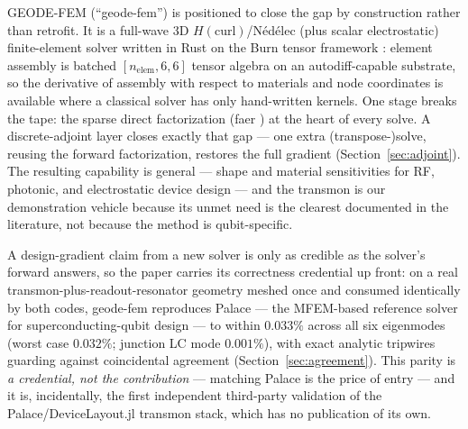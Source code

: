 \documentclass{anvil-paper}
\begin{document}
GEODE-FEM (``geode-fem'') is positioned to close the gap by construction
rather than retrofit. It is a full-wave 3D $H(\mathrm{curl})$/N\'ed\'elec
(plus scalar electrostatic) finite-element solver written in Rust on the
Burn tensor framework \citep{burn}: element assembly is batched
$[n_{\mathrm{elem}},6,6]$ tensor algebra on an autodiff-capable substrate,
so the derivative of assembly with respect to materials and node
coordinates is available where a classical solver has only hand-written
kernels. One stage breaks the tape: the sparse direct factorization
(faer \citep{kazdadi2026faer}) at the heart of every solve. A
discrete-adjoint layer closes exactly that gap --- one extra
(transpose-)solve, reusing the forward factorization, restores the full
gradient (Section~\ref{sec:adjoint}). The resulting capability is
general --- shape and material sensitivities for RF, photonic, and
electrostatic device design --- and the transmon is our demonstration
vehicle because its unmet need is the clearest documented in the
literature, not because the method is qubit-specific.

A design-gradient claim from a new solver is only as credible as the
solver's forward answers, so the paper carries its correctness credential
up front: on a real transmon-plus-readout-resonator geometry meshed once
and consumed identically by both codes, geode-fem reproduces Palace ---
the MFEM-based \citep{mfem,andrej2024high} reference solver for
superconducting-qubit design --- to within $0.033\%$ across all six
eigenmodes (worst case $0.032\%$; junction LC mode $0.001\%$), with exact
analytic tripwires guarding against coincidental agreement
(Section~\ref{sec:agreement}). This parity is \emph{a credential, not the
contribution} --- matching Palace is the price of entry --- and it is,
incidentally, the first independent third-party validation of the
Palace/DeviceLayout.jl transmon stack, which has no publication of its
own.
\end{document}
